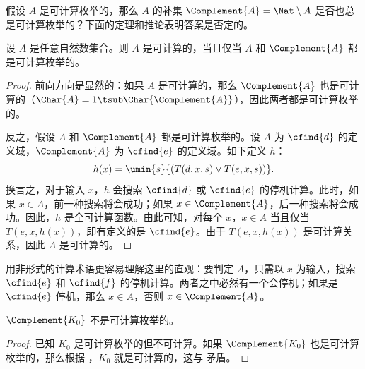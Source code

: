 \documentclass[../../../include/open-logic-section]{subfiles}
\begin{document}

假设 $A$ 是可计算枚举的，那么 $A$ 的补集 $\Complement{A} = \Nat \setminus A$ 是否也总是可计算枚举的？下面的定理和推论表明答案是否定的。

\begin{thm}
设 $A$ 是任意自然数集合。则 $A$ 是可计算的，当且仅当 $A$ 和 $\Complement{A}$ 都是可计算枚举的。
\end{thm}

\begin{proof}
前向方向是显然的：如果 $A$ 是可计算的，那么 $\Complement{A}$ 也是可计算的（$\Char{A} = 1 \tsub
\Char{\Complement{A}}$），因此两者都是可计算枚举的。

反之，假设 $A$ 和 $\Complement{A}$ 都是可计算枚举的。设 $A$ 为 $\cfind{d}$ 的定义域，$\Complement{A}$ 为 $\cfind{e}$ 的定义域。如下定义 $h$：
\[
h(x) = \umin{s}{(T(d,x,s) \lor T(e,x,s))}.
\]
换言之，对于输入 $x$，$h$ 会搜索 $\cfind{d}$ 或 $\cfind{e}$ 的停机计算。此时，如果 $x \in A$，前一种搜索将会成功；如果 $x \in \Complement{A}$，后一种搜索将会成功。因此，$h$ 是全可计算函数。由此可知，对每个 $x$，$x \in A$ 当且仅当 $T(e, x, h(x))$，即有定义的是 $\cfind{e}$。由于 $T(e, x, h(x))$ 是可计算关系，因此 $A$ 是可计算的。
\end{proof}

\begin{explain}
用非形式的计算术语更容易理解这里的直观：要判定 $A$，只需以 $x$ 为输入，搜索 $\cfind{e}$ 和 $\cfind{f}$ 的停机计算。两者之中必然有一个会停机；如果是 $\cfind{e}$ 停机，那么 $x \in A$，否则 $x \in \Complement{A}$。
\end{explain}

\begin{cor}
$\Complement{K_0}$ 不是可计算枚举的。
\end{cor}

\begin{proof}
已知 $K_0$ 是可计算枚举的但不可计算。如果 $\Complement{K_0}$ 也是可计算枚举的，那么根据 ，$K_0$ 就是可计算的，这与  矛盾。
\end{proof}
\end{document}
